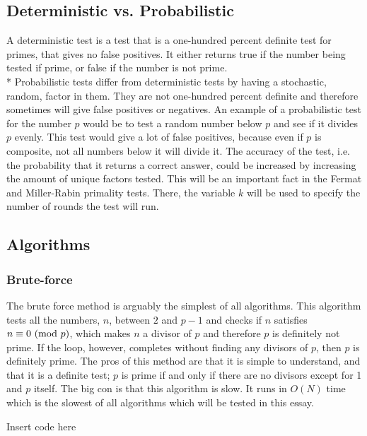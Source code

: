 \documentclass[main.tex]{subfiles}
\begin{document}
\subsection{Deterministic vs. Probabilistic}
A deterministic test is a test that is a one-hundred percent definite test for
primes, that gives no false positives. It either returns true if the number
being tested if prime, or false if the number is not prime. \newline
\\*
Probabilistic tests differ from deterministic tests by having a stochastic,
random, factor in them. They are not one-hundred percent definite and therefore
sometimes will give false positives or negatives. An example of a probabilistic
test for the number $p$ would be to test a random number below $p$ and see if it
divides $p$ evenly. This test would give a lot of false positives, because even
if $p$ is composite, not all numbers below it will divide it. The accuracy of
the test, i.e. the probability that it returns a correct answer, could be
increased by increasing the amount of unique factors tested. This will be an
important fact in the Fermat and Miller-Rabin primality tests. There, the
variable $k$ will be used to specify the number of rounds the test will run.

\subsection{Algorithms}

\subsubsection{Brute-force}
The brute force method is arguably the simplest of all algorithms. This
algorithm tests all the numbers, $n$, between $2$ and $p-1$ and checks if $n$
satisfies $n \equiv 0 \ (\mathrm{mod}\ p)$, which makes $n$ a divisor of $p$ and therefore
$p$ is definitely not prime. If the loop, however, completes without finding any
divisors of $p$, then $p$ is definitely prime. The pros of this method are that
it is simple to understand, and that it is a definite test; $p$ is prime if and
only if there are no divisors except for 1 and $p$ itself. The big con is that
this algorithm is slow. It runs in $O(N)$ time which is the slowest of all
algorithms which will be tested in this essay.

\begin{python}
  Insert code here
\end{python}
\end{document}
